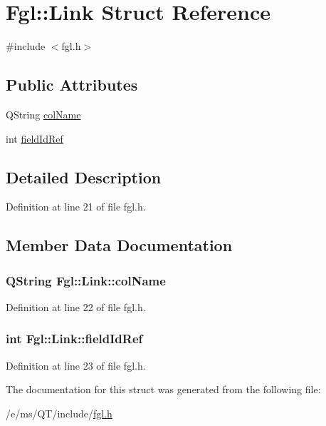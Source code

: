\hypertarget{structFgl_1_1Link}{
\section{Fgl::Link Struct Reference}
\label{structFgl_1_1Link}
}


{\ttfamily \#include $<$fgl.h$>$}

\subsection*{Public Attributes}
\begin{DoxyCompactItemize}
\item 
QString \hyperlink{structFgl_1_1Link_aab28eb1cddb4a867be3eb372229d1047}{colName}
\item 
int \hyperlink{structFgl_1_1Link_a083fb7f6a020a3da8e9b936f2c207bab}{fieldIdRef}
\end{DoxyCompactItemize}


\subsection{Detailed Description}


Definition at line 21 of file fgl.h.



\subsection{Member Data Documentation}
\hypertarget{structFgl_1_1Link_aab28eb1cddb4a867be3eb372229d1047}{
\subsubsection[{colName}]{\setlength{\rightskip}{0pt plus 5cm}QString {\bf Fgl::Link::colName}}}
\label{structFgl_1_1Link_aab28eb1cddb4a867be3eb372229d1047}


Definition at line 22 of file fgl.h.

\hypertarget{structFgl_1_1Link_a083fb7f6a020a3da8e9b936f2c207bab}{
\subsubsection[{fieldIdRef}]{\setlength{\rightskip}{0pt plus 5cm}int {\bf Fgl::Link::fieldIdRef}}}
\label{structFgl_1_1Link_a083fb7f6a020a3da8e9b936f2c207bab}


Definition at line 23 of file fgl.h.



The documentation for this struct was generated from the following file:\begin{DoxyCompactItemize}
\item 
/e/ms/QT/include/\hyperlink{fgl_8h}{fgl.h}\end{DoxyCompactItemize}
